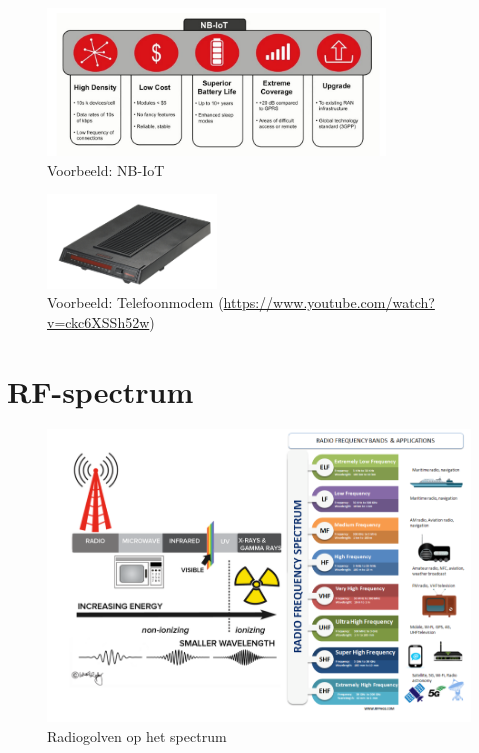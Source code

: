 \documentclass{article}
\begin{document}
\begin{figure}[H]
    \centering
    \includegraphics[width=0.8\textwidth]{Screenshot_20200302_122906.png}
    \caption{Voorbeeld: NB-IoT}
\end{figure}

\begin{figure}[H]
    \centering
    \includegraphics[width=0.4\textwidth]{Screenshot_20200302_122954.png}
    \caption{Voorbeeld: Telefoonmodem (\url{https://www.youtube.com/watch?v=ckc6XSSh52w})}
\end{figure}

\section{RF-spectrum}

\begin{figure}[H]
    \centering
    \includegraphics[width=\textwidth]{Screenshot_20200309_115132.png}
    \caption{Radiogolven op het spectrum}
\end{figure}
\end{document}
